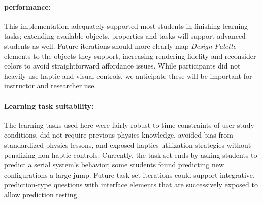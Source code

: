 \paragraph{\SpringSim performance:} %
This \SpringSim implementation adequately supported most students in finishing learning tasks; 
extending available objects, properties and tasks will support advanced students as well.
Future iterations should 
%
more clearly map \textit{Design Palette} elements to the objects they support, 
increasing rendering fidelity and reconsider colors to avoid straightforward affordance issues.
While participants did not heavily use haptic and visual controls, we anticipate these will be important  for instructor and researcher use. 

\paragraph{Learning task suitability:}
The learning tasks used here were fairly robust to time constraints of user-study conditions, did not require previous physics knowledge, avoided bias %
from standardized physics lessons, and exposed haptics utilization strategies without penalizing non-haptic controls. 
Currently, the task set ends 
by asking students to predict a serial system's behavior; some students found predicting new configurations a large jump.  %
Future task-set iterations could support integrative, prediction-type questions with interface elements that are successively exposed to allow prediction testing.



